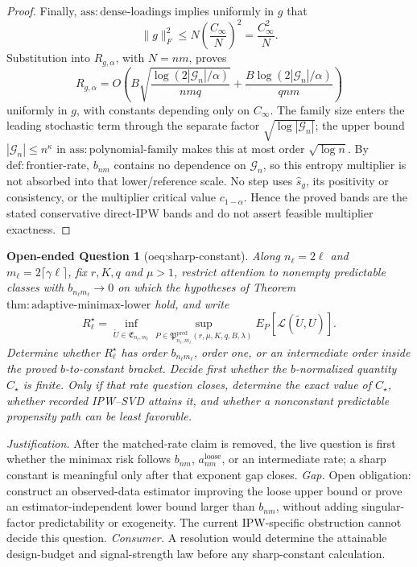 \documentclass{article}
\newtheorem{openendedquestion}{Open-ended Question}
\begin{document}
\begin{proof}
Finally, \(\mathrm{ass:dense\mbox{-}loadings}\) implies uniformly in \(g\) that
\[
 \lVert g\rVert_F^2
 \le N\left(\frac{C_\infty}{N}\right)^2
 =\frac{C_\infty^2}{N}.
\]
Substitution into \(R_{g,\alpha}\), with \(N=nm\), proves
\[
 R_{g,\alpha}
 =O\!\left(
 B\sqrt{\frac{\log(2|\mathcal G_n|/\alpha)}{nmq}}
 +\frac{B\log(2|\mathcal G_n|/\alpha)}{qnm}
 \right)
\]
uniformly in \(g\), with constants depending only on \(C_\infty\).  The family size enters the leading stochastic term through the separate factor \(\sqrt{\log|\mathcal G_n|}\); the upper bound \(|\mathcal G_n|\le n^\kappa\) in \(\mathrm{ass:polynomial\mbox{-}family}\) makes this at most order \(\sqrt{\log n}\).  By \(\mathrm{def:frontier\mbox{-}rate}\), \(b_{nm}\) contains no dependence on \(\mathcal G_n\), so this entropy multiplier is not absorbed into that lower/reference scale.  No step uses \(\widehat s_g\), its positivity or consistency, or the multiplier critical value \(c_{1-\alpha}\).  Hence the proved bands are the stated conservative direct-IPW bands and do not assert feasible multiplier exactness.
\end{proof}

\begin{openendedquestion}[oeq:sharp-constant]\label{oeq:sharp-constant}
Along \(n_\ell=2\ell\) and \(m_\ell=2\lceil\gamma\ell\rceil\), fix \(r,K,q\) and \(\mu>1\), restrict attention to nonempty predictable classes with \(b_{n_\ell m_\ell}\to0\) on which the hypotheses of Theorem \(\mathrm{thm:adaptive\mbox{-}minimax\mbox{-}lower}\) hold, and write
\[
 R_\ell^\star=
 \inf_{\widetilde U\in\mathfrak E_{n_\ell,m_\ell}}
 \sup_{P\in\mathfrak P^{\mathrm{pred}}_{n_\ell,m_\ell}(r,\mu,K,q,B,\lambda)}
 E_P[\mathcal L(\widetilde U,U)].
\]
Determine whether \(R_\ell^\star\) has order \(b_{n_\ell m_\ell}\), order one, or an intermediate order inside the proved \(b\)-to-constant bracket.  Decide first whether the \(b\)-normalized quantity \(C_\star\) is finite.  Only if that rate question closes, determine the exact value of \(C_\star\), whether recorded IPW--SVD attains it, and whether a nonconstant predictable propensity path can be least favorable.
\end{openendedquestion}
\par\smallskip\noindent \textit{Justification.} After the matched-rate claim is removed, the live question is first whether the minimax risk follows \(b_{nm}\), \(a^{\mathrm{loose}}_{nm}\), or an intermediate rate; a sharp constant is meaningful only after that exponent gap closes. \textit{Gap.} Open obligation: construct an observed-data estimator improving the loose upper bound or prove an estimator-independent lower bound larger than \(b_{nm}\), without adding singular-factor predictability or exogeneity.  The current IPW-specific obstruction cannot decide this question. \textit{Consumer.} A resolution would determine the attainable design-budget and signal-strength law before any sharp-constant calculation.
\end{document}
